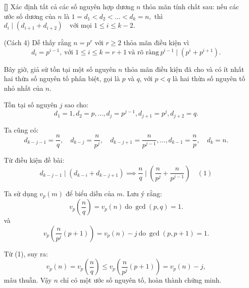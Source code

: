 \documentclass[../06-largest-exponent.tex]{subfiles}
\begin{document}
\begin{example*}\textbf{[]}
    Xác định tất cả các số nguyên hợp dương \( n \) thỏa mãn tính chất sau: nếu các ước số dương của \( n \) là $1 = d_1 < d_2 < \dots < d_k = n,$
    thì $d_i \mid (d_{i+1} + d_{i+2}) \quad \text{với mọi } 1 \leq i \leq k - 2.$
\end{example*}

\begin{soln}(Cách 4)\footnotemark
    Dễ thấy rằng \( n = p^r \) với \( r \geq 2 \) thỏa mãn điều kiện vì 
    \[
        d_i = p^{i-1},\ \text{với } 1 \leq i \leq k = r+1\ \text{và rõ ràng}\ p^{i-1} \mid (p^i + p^{i+1}).
    \]
    
    Bây giờ, giả sử tồn tại một số nguyên \( n \) thỏa mãn điều kiện đã cho và có ít nhất hai thừa số nguyên tố phân biệt,
    gọi là \( p \) và \( q \), với \( p < q \) là hai thừa số nguyên tố nhỏ nhất của \( n \).
    
    Tồn tại số nguyên \( j \) sao cho:
    \[
        d_1 = 1, d_2 = p, \dots, d_j = p^{j-1}, d_{j+1} = p^j, d_{j+2} = q.
    \]
    
    Ta cũng có:
    \[
        d_{k-j-1} = \frac{n}{q}, \quad d_{k-j} = \frac{n}{p^j}, \quad d_{k-j+1} = \frac{n}{p^{j-1}}, \dots, d_{k-1} = \frac{n}{p}, \quad d_k = n.
    \]
    
    Từ điều kiện đề bài:
    \[
        d_{k-j-1} \mid (d_{k-i} + d_{k-j+1}) \implies \frac{n}{q} \mid \left( \frac{n}{p^j} + \frac{n}{p^{j-1}} \right)  \quad (1)
    \]
        
    Ta sử dụng \( v_p(m) \) để biểu diễn  của \( m \). Lưu ý rằng:
    \[
        v_p \left( \frac{n}{q} \right) = v_p(n)\ \text{do}\ \gcd(p,q) = 1.
    \]
    và
    \[
        v_p \left( \frac{n}{p^j} (p+1) \right) = v_p(n) - j \ \text{do}\ \gcd(p,p+1) = 1.
    \]

    Từ (1), suy ra:
    \[
        v_p(n) = v_p \left( \frac{n}{q} \right) \leq v_p \left( \frac{n}{p^j} (p+1) \right) = v_p(n) - j,
    \]
    mâu thuẫn. Vậy \( n \) chỉ có một ước số nguyên tố, hoàn thành chứng minh.
\end{soln}

\end{document}
